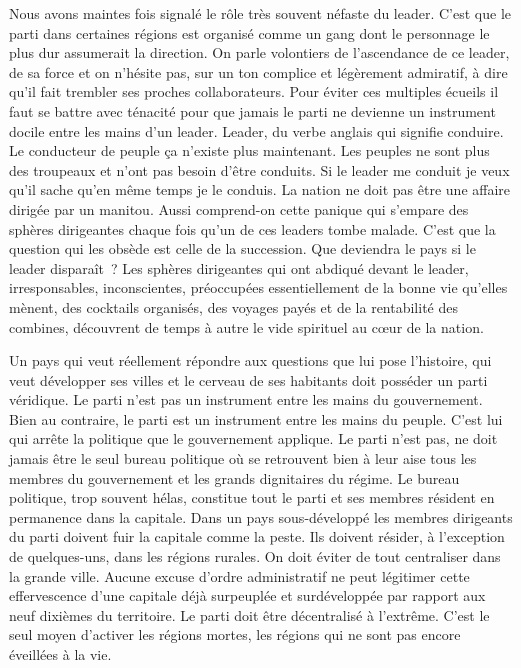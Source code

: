 \documentclass[french,twoside]{book} %
\begin{document}
 Nous avons maintes fois signalé le rôle très souvent néfaste du leader. C’est que le parti dans certaines régions est organisé comme un gang dont le personnage le plus dur assumerait la direction. On parle volontiers de l’ascendance de ce leader, de sa force et on n’hésite pas, sur un ton complice et légèrement admiratif, à dire qu’il fait trembler ses proches collaborateurs. Pour éviter ces multiples écueils il faut se battre avec ténacité pour que jamais le parti ne devienne un instrument docile entre les mains d’un leader. Leader, du verbe anglais qui signifie conduire. Le conducteur de peuple ça n’existe plus maintenant. Les peuples ne sont plus des troupeaux et n’ont pas besoin d’être conduits. Si le leader me conduit je veux qu’il sache qu’en même temps je le conduis. La nation ne doit pas être une affaire dirigée par un manitou. Aussi comprend-on cette panique qui s’empare des sphères dirigeantes chaque fois qu’un de ces leaders tombe malade. C’est que la question qui les obsède est celle de la succession. Que deviendra le pays si le leader disparaît ? Les sphères dirigeantes qui ont abdiqué devant le leader, irresponsables, inconscientes, préoccupées essentiellement de la bonne vie qu’elles mènent, des cocktails organisés, des voyages payés et de la rentabilité des combines, découvrent de temps à autre le vide spirituel au cœur de la nation.\par
Un pays qui veut réellement répondre aux questions que lui pose l’histoire, qui veut développer ses villes et le cerveau de ses habitants doit posséder un parti véridique. Le parti n’est pas un instrument entre les mains du gouvernement. Bien au contraire, le parti est un instrument entre les mains du peuple. C’est lui qui arrête la politique que le gouvernement applique. Le parti n’est pas, ne doit jamais être le seul bureau politique où se retrouvent bien à leur aise tous les membres du gouvernement et les grands dignitaires du régime. Le bureau politique, trop souvent hélas, constitue tout le parti et ses membres résident en permanence dans la capitale. Dans un pays sous-développé les membres dirigeants du parti doivent fuir la capitale comme la peste. Ils doivent résider, à l’exception de quelques-uns, dans les régions rurales. On doit éviter de tout centraliser dans la grande   ville. Aucune excuse d’ordre administratif ne peut légitimer cette effervescence d’une capitale déjà surpeuplée et surdéveloppée par rapport aux neuf dixièmes du territoire. Le parti doit être décentralisé à l’extrême. C’est le seul moyen d’activer les régions mortes, les régions qui ne sont pas encore éveillées à la vie.\par
\end{document}

